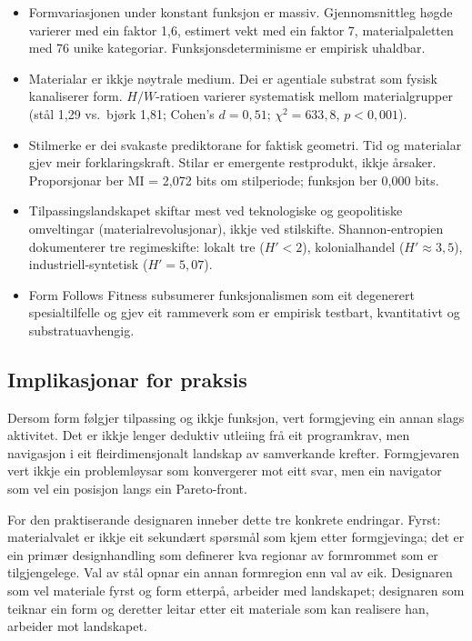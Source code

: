 \documentclass[12pt, a4paper]{article}
\begin{document}
\begin{itemize}
  \item Formvariasjonen under konstant funksjon er massiv. Gjennomsnittleg høgde varierer med ein faktor 1,6, estimert vekt med ein faktor 7, materialpaletten med 76 unike kategoriar. Funksjonsdeterminisme er empirisk uhaldbar.
  \item Materialar er ikkje nøytrale medium. Dei er agentiale substrat som fysisk kanaliserer form. $H/W$-ratioen varierer systematisk mellom materialgrupper (stål 1,29 vs.\ bjørk 1,81; Cohen's $d = 0{,}51$; $\chi^2 = 633{,}8$, $p < 0{,}001$).
  \item Stilmerke er dei svakaste prediktorane for faktisk geometri. Tid og materialar gjev meir forklaringskraft. Stilar er emergente restprodukt, ikkje årsaker. Proporsjonar ber MI = 2,072 bits om stilperiode; funksjon ber 0,000 bits.
  \item Tilpassingslandskapet skiftar mest ved teknologiske og geopolitiske omveltingar (materialrevolusjonar), ikkje ved stilskifte. Shannon-entropien dokumenterer tre regimeskifte: lokalt tre ($H' < 2$), kolonialhandel ($H' \approx 3{,}5$), industriell-syntetisk ($H' = 5{,}07$).
  \item Form Follows Fitness subsumerer funksjonalismen som eit degenerert spesialtilfelle og gjev eit rammeverk som er empirisk testbart, kvantitativt og substratuavhengig.
\end{itemize}

\subsection{Implikasjonar for praksis}

Dersom form følgjer tilpassing og ikkje funksjon, vert formgjeving ein annan slags aktivitet. Det er ikkje lenger deduktiv utleiing frå eit programkrav, men navigasjon i eit fleirdimensjonalt landskap av samverkande krefter. Formgjevaren vert ikkje ein problemløysar som konvergerer mot eitt svar, men ein navigator som vel ein posisjon langs ein Pareto-front.

For den praktiserande designaren inneber dette tre konkrete endringar. Fyrst: materialvalet er ikkje eit sekundært spørsmål som kjem etter formgjevinga; det er ein primær designhandling som definerer kva regionar av formrommet som er tilgjengelege. Val av stål opnar ein annan formregion enn val av eik. Designaren som vel materiale fyrst og form etterpå, arbeider med landskapet; designaren som teiknar ein form og deretter leitar etter eit materiale som kan realisere han, arbeider mot landskapet.
\end{document}
